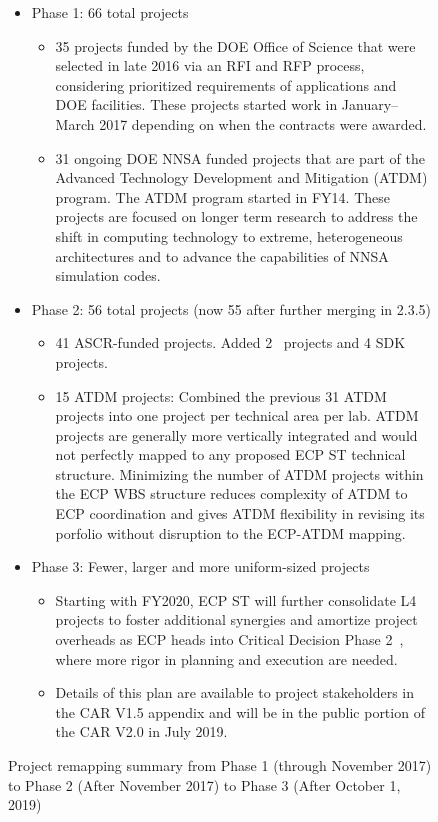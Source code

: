 \begin{figure}
\begin{mdframed}
\begin{itemize}
\item Phase 1: 66 total projects
\begin{itemize}
\item 35 projects funded by the DOE Office of Science that were selected in late 2016 via an RFI and RFP process, considering prioritized requirements of applications and DOE facilities. 
These projects started work in January–March 2017 depending on when the contracts were awarded.
\item 31 ongoing DOE NNSA funded projects that are part of the Advanced Technology Development and Mitigation (ATDM) program. The ATDM program started in FY14.  These projects are focused on longer term research to address the shift in computing technology to extreme, heterogeneous architectures and to advance the capabilities of NNSA simulation codes.
\end{itemize}
\item Phase 2: 56 total projects
(now 55 after further merging in 2.3.5)
\begin{itemize}
\item 41 ASCR-funded projects.  Added  2 \ecosystem\ projects and 4 SDK projects.
\item 15 ATDM projects: Combined the previous 31 ATDM projects into one project per technical area per lab.  ATDM projects are generally more vertically integrated and would not perfectly mapped to any proposed ECP ST technical structure.  Minimizing the number of ATDM projects within the ECP WBS structure reduces complexity of ATDM to ECP coordination and gives ATDM flexibility in revising its porfolio without disruption to the ECP-ATDM mapping.
\end{itemize}
\item Phase 3: Fewer, larger and more uniform-sized projects
\begin{itemize}
	\item Starting with FY2020, ECP ST will further consolidate L4 projects to foster additional synergies and amortize project overheads as ECP heads into Critical Decision Phase 2~\cite{413.3B}, where more rigor in planning and execution are needed.
	\item Details of this plan are available to project stakeholders in the CAR V1.5 appendix and will be in the public portion of the CAR V2.0 in July 2019.
\end{itemize}
\end{itemize}
\end{mdframed}

\caption{\label{fig:project-remapping}Project remapping summary from Phase 1 (through November 2017) to Phase 2 (After November 2017) to Phase 3 (After October 1, 2019)}
\end{figure}


